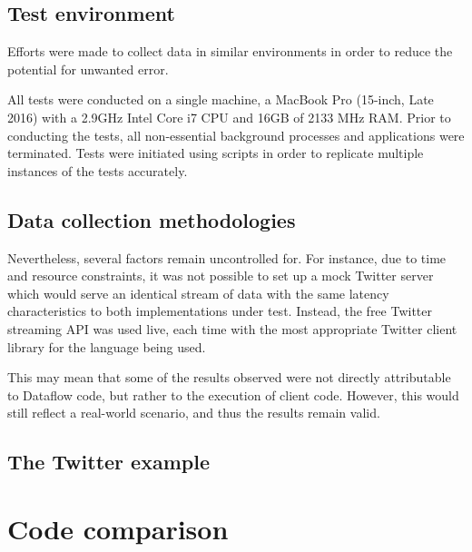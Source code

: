 \subsection{Test environment}\label{sec:eval:approach:environment}

Efforts were made to collect data in similar environments in order to reduce the potential for unwanted error.

All tests were conducted on a single machine, a MacBook Pro (15-inch, Late 2016) with a 2.9GHz Intel Core i7 CPU and 16GB of 2133 MHz RAM.
Prior to conducting the tests, all non-essential background processes and applications were terminated.
Tests were initiated using scripts in order to replicate multiple instances of the tests accurately.



\subsection{Data collection methodologies}\label{sec:eval:approach:collection}

Nevertheless, several factors remain uncontrolled for.
For instance, due to time and resource constraints, it was not possible to set up a mock Twitter server which would serve an identical stream of data with the same latency characteristics to both implementations under test.
Instead, the free Twitter streaming API was used live, each time with the most appropriate Twitter client library for the language being used.

This may mean that some of the results observed were not directly attributable to Dataflow code, but rather to the execution of client code.
However, this would still reflect a real-world scenario, and thus the results remain valid.

\subsection{The Twitter example}\label{sec:eval:approach:twitter}

\section{Code comparison}\label{sec:eval:code}

